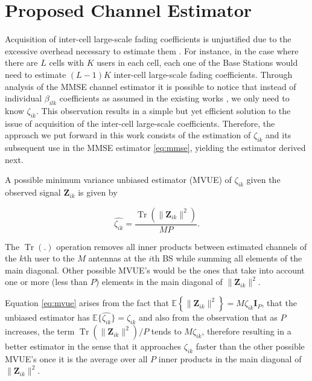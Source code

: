 \documentclass[10pt,journal,comsoc,final]{IEEEtran}
\DeclareMathOperator{\Tr}{Tr}
\begin{document}
\section{Proposed Channel Estimator}

Acquisition of inter-cell large-scale fading coefficients is unjustified due to the excessive overhead necessary to estimate them \cite{fengChen:largeScale}. For instance, in the case where there are $L$ cells with $K$ users in each cell, each one of the Base Stations would need to estimate $(L-1)K$ inter-cell large-scale fading coefficients. Through analysis of the MMSE channel estimator it is possible to notice that instead of individual ${\beta_{ilk}}$ coefficients as assumed in the existing works \cite{marzetta:noncooperative, marzetta:pilotContamination, Debbah:howmanyantennas, Marzetta:finitedimensionalchannels, Ashikhmi:interference_reduction, Bjornson:LowComplexityPolynomial, Gesbert:coordinated}, we only need to know $\zeta_{ik}$. This observation results in a simple but yet efficient solution to the issue of acquisition of the inter-cell large-scale coefficients. Therefore, the approach we put forward in this work consists of the estimation of $\zeta_{ik}$ and its subsequent use in the MMSE estimator \eqref{eq:mmse}, yielding the estimator derived next.

A possible minimum variance unbiased estimator (MVUE) of $\zeta_{ik}$ given the observed signal $\textbf{Z}_{ik}$ is given by \cite{kay:estimationbook}

\begin{equation}\label{eq:mvue}
\hat{\zeta_{ik}} =  \frac{ \Tr \left(  \lVert \textbf{Z}_{ik} \rVert^{2} \right) }{MP}.
\end{equation}

The $\Tr(.)$ operation removes all inner products between estimated channels of the $k$th user to the $M$ antennas at the $i$th BS while summing all elements of the main diagonal. Other possible MVUE's would be the ones that take into account one or more (less than $P$) elements in the main diagonal of $\lVert \textbf{Z}_{ik} \rVert^{2}$. 

Equation \eqref{eq:mvue} arises from the fact that $\mathbb{E} \left\lbrace \lVert \textbf{Z}_{ik} \rVert^{2} \right\rbrace = M \zeta_{ik} \textbf{I}_{P}$, that the unbiased estimator has $\mathbb{E} \{ \hat{\zeta_{ik}} \} =\zeta_{ik}$ and also from the observation that as $P$ increases, the term $ \Tr \left(  \lVert \textbf{Z}_{ik} \rVert^{2} \right) / P$ tends to $M\zeta_{ik}$, therefore resulting in a better estimator in the sense that it approaches $\zeta_{ik}$ faster than the other possible MVUE's once it is the average over all $P$ inner products in the main diagonal of $\lVert \textbf{Z}_{ik} \rVert^{2}$.
\end{document}
